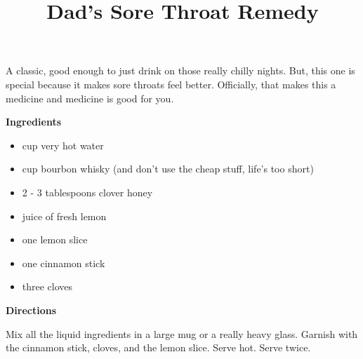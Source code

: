 \documentclass{article}
\title{Dad's Sore Throat Remedy}
\begin{document}
A classic, good enough to just drink on those really chilly nights. But, this one is special because
it makes sore throats feel better. Officially, that makes this a medicine and medicine is good for
you.

\bigskip

\bigskip

\textbf{Ingredients}

\begin{itemize}
      \item {} cup very hot water
      \item {} cup bourbon whisky (and don't use the cheap stuff, life's too short)
      \item 2 - 3 tablespoons clover honey
      \item juice of  fresh lemon
      \item one lemon slice
      \item one cinnamon stick
      \item three cloves
\end{itemize}

\bigskip

\textbf{Directions}

Mix all the liquid ingredients in a large mug or a really heavy glass.
Garnish with the cinnamon stick, cloves, and the lemon slice. Serve hot. Serve twice.

\end{document}
